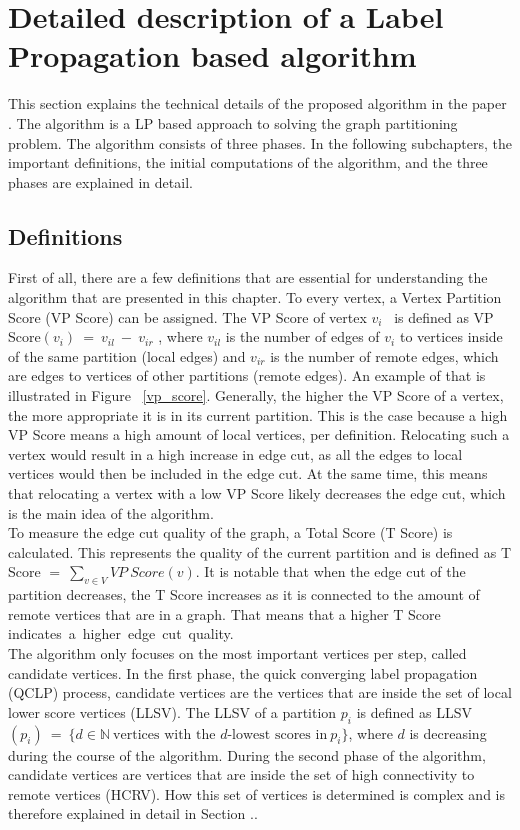 \documentclass[acmsmall,nonacm,screen,review]{acmart}
\begin{document}
\section{Detailed description of a Label Propagation based algorithm}
This section explains the technical details of the proposed algorithm in the paper \cite{Main}. The algorithm is a LP based approach to solving the graph partitioning problem. The algorithm consists of three phases. In the following subchapters, the important definitions, the initial computations of the algorithm, and the three phases are explained in detail.
\subsection{Definitions}
First of all, there are a few definitions that are essential for understanding the algorithm that are presented in this chapter. To every vertex, a Vertex Partition Score (VP Score) can be assigned. The VP Score of vertex $v_{i}$ \ is defined as VP Score$(v_{i})\ =\ v_{il}\ -\ v_{ir}$ , where $v_{il}$ is the number of edges of $v_{i}$ to vertices inside of the same partition (local edges) and $v_{ir}$ is the number of remote edges, which are edges to vertices of other partitions (remote edges). An example of that is illustrated in Figure ~\ref{vp_score}. Generally, the higher the VP Score of a vertex, the more appropriate it is in its current partition. This is the case because a high VP Score means a high amount of local vertices, per definition. Relocating such a vertex would result in a high increase in edge cut, as all the edges to local vertices would then be included in the edge cut. At the same time, this means that relocating a vertex with a low VP Score likely decreases the edge cut, which is the main idea of the algorithm. \\
To measure the edge cut quality of the graph, a Total Score (T Score) is calculated. This represents the quality of the current partition and is defined as T Score $=\ \sum_{v\in V} VP\ Score(v)$. It is notable that when the edge cut of the partition decreases, the T Score increases as it is connected to the amount of remote vertices that are in a graph. That means that a higher T Score \hbox{indicates a higher edge cut quality.} \\
The algorithm only focuses on the most important vertices per step, called candidate vertices. In the first phase, the quick converging label propagation (QCLP) process, candidate vertices are the vertices that are inside the set of local lower score vertices (LLSV). The LLSV of a partition $p_{i}$ is defined as LLSV$(p_{i})\ =\ \{ d\in \mathbb{N}\ \text{vertices with the }d\text{-lowest scores in}\ p_{i}\}$, where $d$ is decreasing during the course of the algorithm. During the second phase of the algorithm, candidate vertices are vertices that are inside the set of high connectivity to remote vertices (HCRV). How this set of vertices is determined is complex and is therefore explained in detail in Section ..
\end{document}
